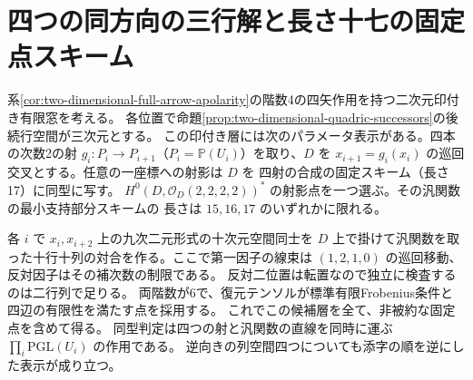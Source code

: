 \section{四つの同方向の三行解と長さ十七の固定点スキーム}
\label{sec:directed-binary-defect-cycle}
\begin{theorem}\label{thm:directed-binary-defect-cycle}
系\ref{cor:two-dimensional-full-arrow-apolarity}の階数4の四矢作用を持つ二次元印付き有限窓を考える。
各位置で命題\ref{prop:two-dimensional-quadric-successors}の後続行空間が三次元とする。
この印付き層には次のパラメータ表示がある。四本の次数2の射
$g_i:P_i\to P_{i+1}$（$P_i=\mathbb P(U_i)$）を取り、$D$ を
$x_{i+1}=g_i(x_i)$ の巡回交叉とする。任意の一座標への射影は $D$ を
四射の合成の固定スキーム（長さ17）に同型に写す。
$H^0(D,\mathcal O_D(2,2,2,2))^*$ の射影点を一つ選ぶ。その汎関数の最小支持部分スキームの
長さは $15,16,17$ のいずれかに限れる。

各 $i$ で $x_i,x_{i+2}$ 上の九次二元形式の十次元空間同士を
$D$ 上で掛けて汎関数を取った十行十列の対合を作る。ここで第一因子の線束は
$(1,2,1,0)$ の巡回移動、反対因子はその補次数の制限である。
反対二位置は転置なので独立に検査するのは二行列で足りる。
両階数が6で、復元テンソルが標準有限Frobenius条件と四辺の有限性を満たす点を採用する。
これでこの候補層を全て、非被約な固定点を含めて得る。
同型判定は四つの射と汎関数の直線を同時に運ぶ $\prod_i\mathrm{PGL}(U_i)$ の作用である。
逆向きの列空間四つについても添字の順を逆にした表示が成り立つ。
\end{theorem}
